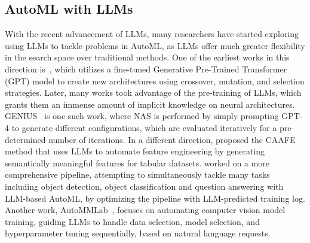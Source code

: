 \subsection{AutoML with LLMs}
With the recent advancement of LLMs, many researchers have started exploring using LLMs to tackle problems in AutoML, as LLMs offer much greater flexibility in the search space over traditional methods. One of the earliest works in this direction is~\cite{yu2023gptnas}, which utilizes a fine-tuned Generative Pre-Trained Transformer (GPT) model to create new architectures using crossover, mutation, and selection strategies. Later, many works took advantage of the pre-training of LLMs, which grants them an immense amount of implicit knowledge on neural architectures. GENIUS~\citep{zheng2023genius} is one such work, where NAS is performed by simply prompting GPT-4 to generate different configurations, which are evaluated iteratively for a pre-determined number of iterations. In a different direction, \cite{hollmann2024caafe} proposed the CAAFE method that uses LLMs to automate feature engineering by generating semantically meaningful features for tabular datasets. \cite{zhang2023automlgpt} worked on a more comprehensive pipeline, attempting to simultaneously tackle many tasks including object detection, object classification and question answering with LLM-based AutoML, by optimizing the pipeline with LLM-predicted training log. Another work, AutoMMLab~\citep{yang2024autommlab}, focuses on automating computer vision model training, guiding LLMs to handle data selection, model selection, and hyperparameter tuning sequentially, based on natural language requests.


